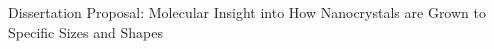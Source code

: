 Dissertation Proposal: Molecular Insight into How Nanocrystals are Grown to Specific Sizes and Shapes
    